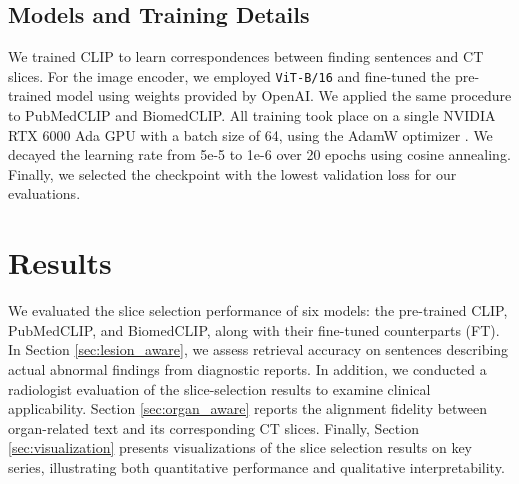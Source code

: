 \documentclass[bioengineering,article,submit,pdftex,moreauthors]{Definitions/mdpi}
\begin{document}
\subsection{Models and Training Details}
We trained CLIP to learn correspondences between finding sentences and CT slices. 
For the image encoder, we employed \texttt{ViT-B/16} and fine-tuned the pre-trained model using weights provided by OpenAI. 
We applied the same procedure to PubMedCLIP and BiomedCLIP.
All training took place on a single NVIDIA RTX 6000 Ada GPU with a batch size of 64, using the AdamW optimizer \cite{loshchilov_fixing_2017}. 
We decayed the learning rate from 5e-5 to 1e-6 over 20 epochs using cosine annealing. 
Finally, we selected the checkpoint with the lowest validation loss for our evaluations.



\section{Results}

We evaluated the slice selection performance of six models: the pre-trained CLIP, PubMedCLIP, and BiomedCLIP, along with their fine-tuned counterparts (FT). 
In Section \ref{sec:lesion_aware}, we assess retrieval accuracy on sentences describing actual abnormal findings from diagnostic reports. 
In addition, we conducted a radiologist evaluation of the slice-selection results to examine clinical applicability.
Section \ref{sec:organ_aware} reports the alignment fidelity between organ-related text and its corresponding CT slices. 
Finally, Section \ref{sec:visualization} presents visualizations of the slice selection results on key series, illustrating both quantitative performance and qualitative interpretability.
\end{document}
